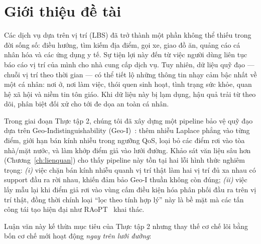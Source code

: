 \chapter{Giới thiệu đề tài}
\label{ch:gioithieu}

Các dịch vụ dựa trên vị trí (LBS) đã trở thành một phần không thể thiếu trong đời
sống số: điều hướng, tìm kiếm địa điểm, gọi xe, giao đồ ăn, quảng cáo cá nhân hóa
và các ứng dụng y tế. Sự tiện lợi này đến từ việc người dùng liên tục báo cáo vị
trí của mình cho nhà cung cấp dịch vụ. Tuy nhiên, dữ liệu quỹ đạo --- chuỗi vị trí
theo thời gian --- có thể tiết lộ những thông tin nhạy cảm bậc nhất về một cá
nhân: nơi ở, nơi làm việc, thói quen sinh hoạt, tình trạng sức khỏe, quan hệ xã
hội và niềm tin tôn giáo. Khi dữ liệu này bị lạm dụng, hậu quả trải từ theo dõi,
phân biệt đối xử cho tới đe dọa an toàn cá nhân.

Trong giai đoạn Thực tập 2, chúng tôi đã xây dựng một pipeline bảo vệ quỹ đạo
dựa trên Geo-Indistinguishability (Geo-I)~\cite{andres2013geo}: thêm nhiễu Laplace
phẳng vào từng điểm, giới hạn bán kính nhiễu trong ngưỡng QoS, loại bỏ các điểm
rơi vào tòa nhà/mặt nước, và làm khớp điểm giả vào lưới đường. Khảo sát văn liệu
sâu hơn (Chương~\ref{ch:lienquan}) cho thấy pipeline này tồn tại hai lỗi hình thức
nghiêm trọng: \emph{(i)} việc chặn bán kính nhiễu quanh vị trí thật làm hai vị trí
đủ xa nhau có support đầu ra rời nhau, khiến đảm bảo Geo-I thuần không còn đúng;
\emph{(ii)} việc lấy mẫu lại khi điểm giả rơi vào vùng cấm điều kiện hóa phân phối
đầu ra trên vị trí thật, đồng thời chính loại ``lọc theo tính hợp lý'' này là bề
mặt mà các tấn công tái tạo hiện đại như RAoPT~\cite{buchholz2022raopt} khai thác.

Luận văn này kế thừa mục tiêu của Thực tập 2 nhưng thay thế cơ chế lõi bằng bốn
cơ chế mới hoạt động \emph{ngay trên lưới đường}:

